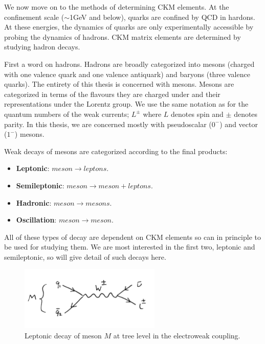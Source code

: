 We now move on to the methods of determining CKM elements. At the confinement scale ($\sim$1GeV and below), quarks are confined by QCD in hardons. At these energies, the dynamics of quarks are only experimentally accessible by probing the dynamics of hadrons. CKM matrix elements are determined by studying hadron decays.

First a word on hadrons. Hadrons are broadly categorized into mesons (charged with one valence quark and one valence antiquark) and baryons (three valence quarks). The entirety of this thesis is concerned with mesons. Mesons are categorized in terms of the flavours they are charged under and their representations under the Lorentz group. We use the same notation as for the quantum numbers of the weak currents; $L^{\pm}$ where $L$ denotes spin and $\pm$ denotes parity. In this thesis, we are concerned mostly with pseudoscalar ($0^-$) and vector ($1^-$) mesons.

Weak decays of mesons are categorized according to the final products:
\begin{itemize}
\item
  {\bf{Leptonic}}: $meson \to leptons$.
\item
  {\bf{Semileptonic}}: $meson \to meson + leptons$.
\item
  {\bf{Hadronic}}: $meson \to mesons$.
\item
  {\bf{Oscillation}}: $meson \to meson$.
\end{itemize}

All of these types of decay are dependent on CKM elements so can in principle to be used for studying them. We are most interested in the first two, leptonic and semileptonic, so will give detail of such decays here.

\begin{figure}
  \vspace{-10pt}
  \begin{center}
    \includegraphics[width=0.6\textwidth]{images/leptonicdecay.jpg}
  \end{center}
  \vspace{-20pt}
  \caption{Leptonic decay of meson $M$ at tree level in the electroweak coupling.}
  \label{fig:leptonicdecay}
\end{figure}


